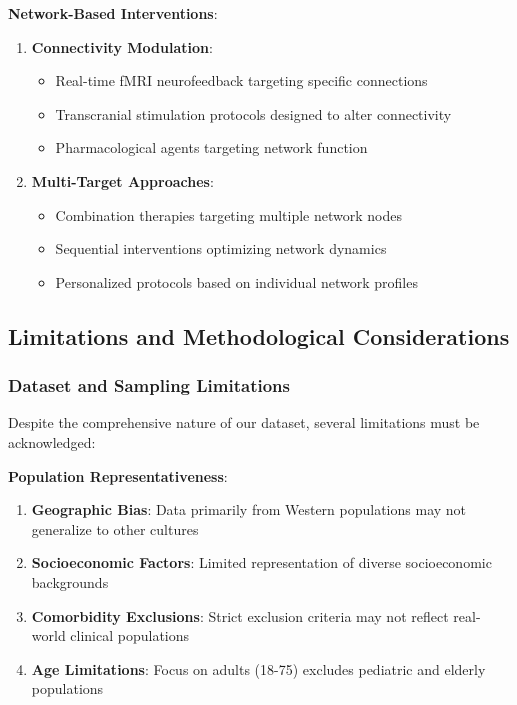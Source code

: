 \documentclass[10pt,journal,compsoc]{IEEEtran}
\begin{document}
\textbf{Network-Based Interventions}:

\begin{enumerate}
\item \textbf{Connectivity Modulation}:
   \begin{itemize}
   \item Real-time fMRI neurofeedback targeting specific connections
   \item Transcranial stimulation protocols designed to alter connectivity
   \item Pharmacological agents targeting network function
   \end{itemize}

\item \textbf{Multi-Target Approaches}:
   \begin{itemize}
   \item Combination therapies targeting multiple network nodes
   \item Sequential interventions optimizing network dynamics
   \item Personalized protocols based on individual network profiles
   \end{itemize}
\end{enumerate}

\subsection{Limitations and Methodological Considerations}

\subsubsection{Dataset and Sampling Limitations}

Despite the comprehensive nature of our dataset, several limitations must be acknowledged:

\textbf{Population Representativeness}:

\begin{enumerate}
\item \textbf{Geographic Bias}: Data primarily from Western populations may not generalize to other cultures
\item \textbf{Socioeconomic Factors}: Limited representation of diverse socioeconomic backgrounds
\item \textbf{Comorbidity Exclusions}: Strict exclusion criteria may not reflect real-world clinical populations
\item \textbf{Age Limitations}: Focus on adults (18-75) excludes pediatric and elderly populations
\end{enumerate}
\end{document}
